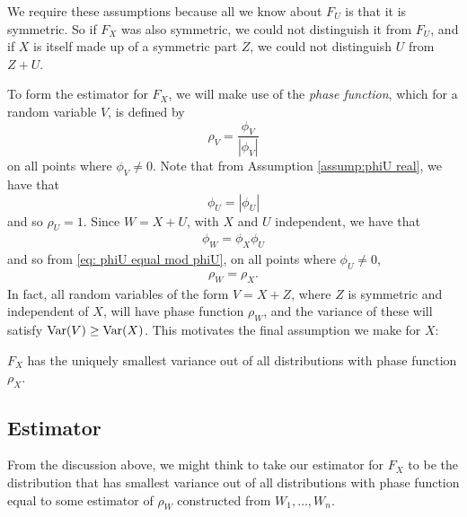 	We require these assumptions because all we know about $F_U$ is that it is symmetric. So if $F_X$ was also symmetric, we could not distinguish it from $F_U$, and if $X$ is itself made up of a symmetric part $Z$, we could not distinguish $U$ from $Z+U$.


	To form the estimator for $F_X$, we will make use of the \emph{phase function}, which for a random variable $V$, is defined by
	\begin{equation}
		\rho_V = \frac{\phi_V}{|\phi_V|}
	\end{equation}
	on all points where $\phi_V \neq 0$.
	Note that from Assumption \ref{assump:phiU real}, we have that 
	\begin{equation}
	\label{eq: phiU equal mod phiU}
		\phi_U = |\phi_U|
	\end{equation}
	and so $\rho_U = 1$.
	Since $W = X+U$, with $X$ and $U$ independent, we have that
	\begin{align}
		\phi_W = \phi_X \phi_U
	\end{align}
	and so from \eqref{eq: phiU equal mod phiU}, on all points where $\phi_U \neq 0$,
	\begin{align}
		\rho_W = \rho_X.
	\end{align}
	In fact, all random variables of the form $V = X + Z$, where $Z$ is symmetric and independent of $X$, will have phase function $\rho_W$, and the variance of these will satisfy $\mathrm{Var}(V) \geq \mathrm{Var}(X)$. This motivates the final assumption we make for $X$:

	\begin{assumption}
	\label{assump:X has smallest variance}
		$F_X$ has the uniquely smallest variance out of all distributions with phase function $\rho_X$.
	\end{assumption}

	\subsection{Estimator}
	\label{sec:deconvolution estimator}
	From the discussion above, we might think to take our estimator for $F_X$ to be the distribution that has smallest variance out of all distributions with phase function equal to some estimator of $\rho_W$ constructed from $W_1, \dots, W_n$.


